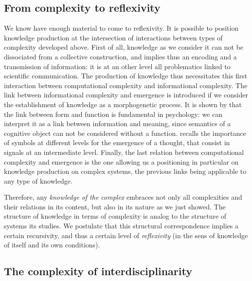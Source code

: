 \subsection{From complexity to reflexivity}

We know have enough material to come to reflexivity. It is possible to position knowledge production at the intersection of interactions between types of complexity developed above. First of all, knowledge as we consider it can not be dissociated from a collective construction, and implies thus an encoding and a transmission of information: it is at an other level all problematics linked to scientific communication. The production of knowledge thus necessitates this first interaction between computational complexity and informational complexity. The link between informational complexity and emergence is introduced if we consider the establishment of knowledge as a morphogenetic process. It is shown by \cite{antelope2016interdisciplinary} that the link between form and function is fundamental in psychology: we can interpret it as a link between information and meaning, since semantics of a cognitive object can not be considered without a function. \cite{hofstadter1980godel} recalls the importance of symbols at different levels for the emergence of a thought, that consist in signals at an intermediate level. Finally, the last relation between computational complexity and emergence is the one allowing us a positioning in particular on knowledge production on complex systems, the previous links being applicable to any type of knowledge.

Therefore, any \emph{knowledge of the complex} embraces not only all complexities and their relations in its content, but also in its nature as we just showed. The structure of knowledge in terms of complexity is analog to the structure of systems its studies. We postulate that this structural correspondence implies a certain recursivity, and thus a certain level of \emph{reflexivity} (in the sens of knowledge of itself and its own conditions).


\subsection{The complexity of interdisciplinarity}


